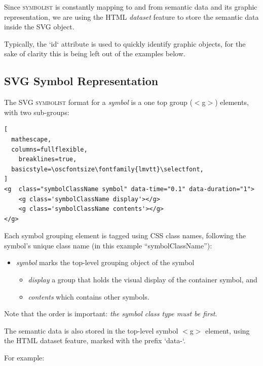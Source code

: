 \documentclass{article}
\def\symbolist{\textsc{symbolist}\xspace}
\def\oscfontsize{\footnotesize}
\begin{document}
Since \symbolist is constantly mapping to and from semantic data and its graphic representation, we are using the HTML \textit{dataset} feature to store the semantic data inside the SVG object.

Typically, the `id` attribute is used to quickly identify graphic objects, for the sake of clarity this is being left out of the examples below.

\subsection{SVG Symbol Representation}\label{subsec:symbol}

\begin{minipage}{\linewidth}
The SVG \symbolist format for a \textit{symbol} is a one top group ($<$g$>$) elements, with two sub-groups:

\begin{lstlisting}[
  mathescape,
  columns=fullflexible,
    breaklines=true,
  basicstyle=\oscfontsize\fontfamily{lmvtt}\selectfont,
]
<g  class="symbolClassName symbol" data-time="0.1" data-duration="1">
    <g class='symbolClassName display'></g>
    <g class='symbolClassName contents'></g>
</g>
\end{lstlisting}
\end{minipage}



Each symbol grouping element is tagged using CSS class names, following the symbol's unique class name (in this example ``symbolClassName''):
\begin{itemize}\itemsep0pt 
\item \textit{symbol} marks the top-level grouping object of the symbol
\begin{itemize}\itemsep0pt 
  \item \textit{display} a group that holds the visual display of the container symbol, and
  \item \textit{contents} which contains other symbols.
  \end{itemize}
\end{itemize}



Note that the order is important: \textit{the symbol class type must be first}.

The semantic data is also stored in the top-level symbol $<$g$>$ element, using the HTML dataset feature, marked with the prefix `data-`.

For example:
\end{document}
